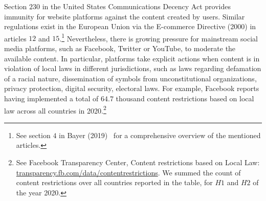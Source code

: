 \documentclass{article}
\begin{document}
Section $230$ in the United States Communications Decency Act provides immunity for website platforms against the content created by users. Similar regulations exist in the European Union via the E-commerce Directive (2000) in articles $12$ and $15$.\footnote{See section $4$ in Bayer (2019)~\cite{Bayer} for a comprehensive overview of the mentioned articles.} Nevertheless, there is growing pressure for mainstream social media platforms, such as Facebook, Twitter or YouTube, to moderate the available content. In particular, platforms take explicit actions when content is in violation of local laws in different jurisdictions, such as laws regarding defamation of a racial nature, dissemination of symbols from unconstitutional organizations, privacy protection, digital security, electoral laws. For example, Facebook reports having implemented a total of $64.7$ thousand content restrictions based on local law across all countries in 2020.\footnote{See Facebook Transparency Center, Content restrictions based on Local Law: \href{https://transparency.fb.com/data/content\-restrictions}{transparency.fb.com/data/content\-restrictions}. We summed the count of content restrictions over all countries reported in the table, for $H1$ and $H2$ of the year 2020.} %

\smallskip
\end{document}
